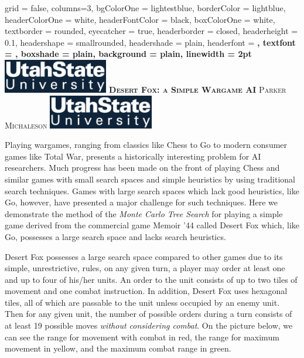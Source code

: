 \documentclass[landscape,final,a0paper,fontscale=0.277]{baposter}
\begin{document}
\begin{poster}
{
	grid = false,
	columns=3,
	bgColorOne = lightestblue,
	borderColor = lightblue,
	headerColorOne = white,
	headerFontColor = black,
	boxColorOne = white,
	textborder = rounded,
	eyecatcher = true,
	headerborder = closed,
	headerheight = 0.1\textheight,
	headershape = smallrounded,
	headershade = plain,
	headerfont =  \Large\bf\textsc,
	textfont = {\setlength{\parindent}{1.5em}},
	boxshade = plain,
	background = plain,
	linewidth = 2pt
}
{\includegraphics[height=4em]{./images/logo}}
{\bf\textsc{Desert Fox: a Simple Wargame AI}\vspace{0.5em}}
{\textsc{Parker Michaleson}}
{\includegraphics[height=4em]{./images/logo}}

{
Playing wargames, ranging from classics like Chess to Go to modern consumer games like Total War, presents a historically interesting problem for AI researchers. Much progress has been made on the front of playing Chess and similar games with small search spaces and simple heuristics by using traditional search techniques. Games with large search spaces which lack good heuristics, like Go, however, have presented a major challenge for such techniques. Here we demonstrate the method of the {\it Monte Carlo Tree Search} for playing a simple game derived from the commercial game Memoir '44 called Desert Fox which, like Go, possesses a large search space and lacks search heuristics.
}

{
Desert Fox possesses a large search space compared to other games due to its simple, unrestrictive, rules, on any given turn, a player may order at least one and up to four of his/her units. An order to the unit consists of up to two tiles of movement and one combat instruction. In addition, Desert Fox uses hexagonal tiles, all of which are passable to the unit unless occupied by an enemy unit. Then for any given unit, the number of possible orders during a turn consists of at least 19 possible moves {\it without considering combat}. On the picture below, we can see the range for movement with combat in red, the range for maximum movement in yellow, and the maximum combat range in green.

}
\end{poster}
\end{document}
